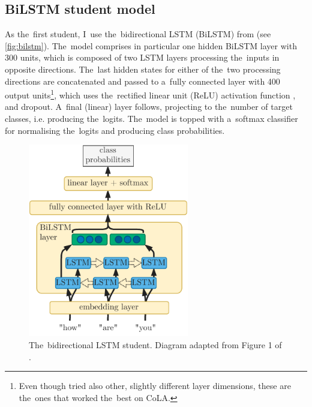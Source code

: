 \documentclass[bsc,frontabs,singlespacing,parskip,deptreport]{infthesis}
\begin{document}
{{    \subsection{BiLSTM student model}{
      \label{sec:student-bilstm}
      As the~first student, I~use the~bidirectional LSTM (BiLSTM) from \citeauthor{Tang_2019b} (see \autoref{fig:bilstm}). The~model comprises in particular one hidden BiLSTM layer with 300 units, which is composed of two LSTM layers processing the~inputs in opposite directions. The~last hidden states for either of the~two processing directions are concatenated and passed to a~fully connected layer with 400 output units\footnote{Even though \citeauthor{Tang_2019b} tried also other, slightly different layer dimensions, these are the~ones that worked the~best on CoLA.}, which uses the~rectified linear unit (ReLU) activation function \citep{Nair_2010}, and dropout. A~final (linear) layer follows, projecting to the~number of target classes, i.e. producing the~logits. The~model is topped with a~softmax classifier for normalising the~logits and producing class probabilities.
      \begin{figure}[h!t]
        \centering
        \includegraphics[width=7cm]{graphics/bilstm}
        \caption{The~bidirectional LSTM student. Diagram adapted from Figure 1 of \citet{Tang_2019a}.}
        \label{fig:bilstm}
      \end{figure}

}}}
\end{document}

